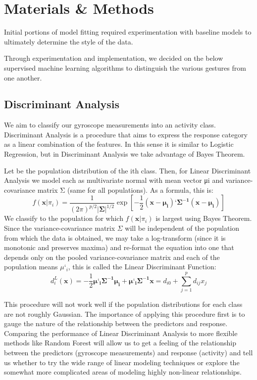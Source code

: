 \documentclass[12pt]{article}
\begin{document}
\section{Materials \& Methods}
Initial portions of model fitting required experimentation with baseline models to ultimately determine the style of the data. 

Through experimentation and implementation, we decided on the below supervised machine learning algorithms to distinguish the various gestures from one another. 

\subsection{Discriminant Analysis}
We aim to classify our gyroscope measurements into an activity class. Discriminant Analysis is a procedure that aims to express the response category as a linear combination of the features. In this sense it is similar to Logistic Regression, but in Discriminant Analysis we take advantage of Bayes Theorem.

Let be the population distribution of the ith class. Then, for Linear Discriminant Analysis we model each  as multivariate normal with mean vector μi and variance-covariance matrix Σ (same for all populations). As a formula, this is:
$$f(\mathbf{x}|\pi_i) = \frac{1}{(2\pi)^{p/2}|\mathbf{\Sigma}|^{1/2}}\exp\left[-\frac{1}{2}\mathbf{(x-\mu_i)‘\Sigma^{-1}(x-\mu_i)}\right]$$
We classify to the population for which $f(\mathbf{x}|\pi_i)$ is largest using Bayes Theorem. Since the variance-covariance matrix $\Sigma$ will be independent of the population from which the data is obtained, we may take a log-transform (since it is monotonic and preserves maxima) and re-format the equation into one that depends only on the pooled variance-covariance matrix and each of the population means $\mu‘_i$, this is called the Linear Discriminant Function:
$$d^L_i(\mathbf{x}) = -\frac{1}{2}\mathbf{\mu‘_i\Sigma^{-1}\mu_i + \mu‘_i\Sigma^{-1}x} = d_{i0} + \sum_{j=1}^{p}d_{ij}x_j$$

This procedure will not work well if the population distributions for each class are not roughly Gaussian.\cite{IEEE} The importance of applying this procedure first is to gauge the nature of the relationship between the predictors and response. Comparing the performance of Linear Discriminant Analysis to more flexible methods like Random Forest will allow us to get a feeling of the relationship between the predictors (gyroscope measurements) and response (activity) and tell us whether to try the wide range of linear modeling techniques or explore the somewhat more complicated areas of modeling highly non-linear relationships.
\end{document}
